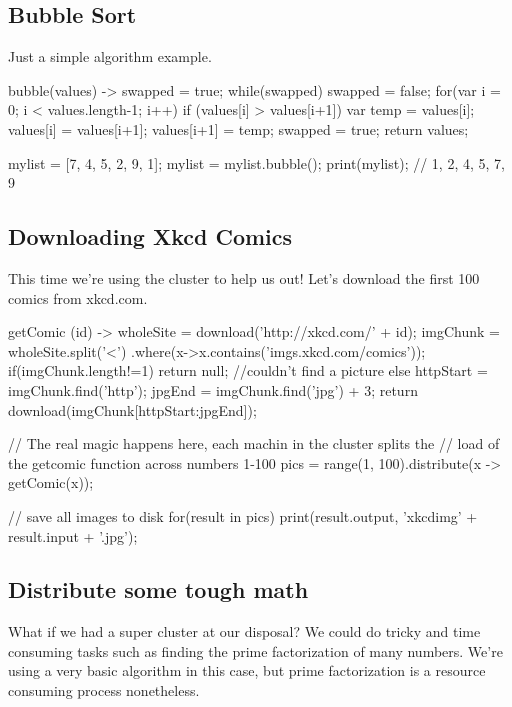 \documentclass[letterpaper]{article}
\begin{document}
\subsection{Bubble Sort}
Just a simple algorithm example.
\begin{mdframed}[hidealllines=true,backgroundcolor=gray!10,skipbelow=1em,skipabove=.5em]
\begin{code}
bubble(values) -> {
	swapped = true;
	while(swapped) {
		swapped = false;
		for(var i = 0; i < values.length-1; i++) {
			if (values[i] > values[i+1]) {
				var temp = values[i];
				values[i] = values[i+1];
				values[i+1] = temp;
				swapped = true;
		  	}
		}
	}
	return values;
}

mylist = [7, 4, 5, 2, 9, 1];
mylist = mylist.bubble();
print(mylist); // 1, 2, 4, 5, 7, 9 
\end{code}
\end{mdframed}

\subsection{Downloading Xkcd Comics}
This time we're using the cluster to help us out! Let's download the first 100 comics from xkcd.com.
\begin{mdframed}[hidealllines=true,backgroundcolor=gray!10,skipbelow=1em,skipabove=.5em]
\begin{code}
getComic (id) -> {
	wholeSite = download('http://xkcd.com/' + id);
	imgChunk = wholeSite.split('<')
		.where(x->x.contains('imgs.xkcd.com/comics'));
	if(imgChunk.length!=1){ 
		return null; //couldn't find a picture
	}
	else{
		httpStart = imgChunk.find('http');
		jpgEnd = imgChunk.find('jpg') + 3;
		return download(imgChunk[httpStart:jpgEnd]);
	}
}

// The real magic happens here, each machin in the cluster splits the
// load of the getcomic function across numbers 1-100
pics = range(1, 100).distribute(x -> getComic(x));

// save all images to disk
for(result in pics) {
	print(result.output, 'xkcdimg' + result.input + '.jpg');
}
\end{code}
\end{mdframed}

\subsection{Distribute some tough math}
What if we had a super cluster at our disposal? We could do tricky and time consuming tasks such as finding the prime factorization of many numbers. We're using a very basic algorithm in this case, but prime factorization is a resource consuming process nonetheless.
\end{document}
